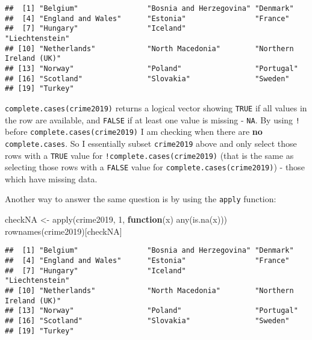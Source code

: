 \documentclass[
]{article}
\newenvironment{Shaded}{\begin{snugshade}}{\end{snugshade}}
\newcommand{\ControlFlowTok}[1]{\textcolor[rgb]{0.13,0.29,0.53}{\textbf{#1}}}
\newcommand{\DecValTok}[1]{\textcolor[rgb]{0.00,0.00,0.81}{#1}}
\newcommand{\FunctionTok}[1]{\textcolor[rgb]{0.00,0.00,0.00}{#1}}
\newcommand{\NormalTok}[1]{#1}
\newcommand{\OtherTok}[1]{\textcolor[rgb]{0.56,0.35,0.01}{#1}}
\begin{document}
\begin{verbatim}
##  [1] "Belgium"                "Bosnia and Herzegovina" "Denmark"               
##  [4] "England and Wales"      "Estonia"                "France"                
##  [7] "Hungary"                "Iceland"                "Liechtenstein"         
## [10] "Netherlands"            "North Macedonia"        "Northern Ireland (UK)" 
## [13] "Norway"                 "Poland"                 "Portugal"              
## [16] "Scotland"               "Slovakia"               "Sweden"                
## [19] "Turkey"
\end{verbatim}

\texttt{complete.cases(crime2019)} returns a logical vector showing
\texttt{TRUE} if all values in the row are available, and \texttt{FALSE}
if at least one value is missing - \texttt{NA}. By using \texttt{!}
before \texttt{complete.cases(crime2019)} I am checking when there are
\textbf{no} \texttt{complete.cases}. So I essentially subset
\texttt{crime2019} above and only select those rows with a \texttt{TRUE}
value for \texttt{!complete.cases(crime2019)} (that is the same as
selecting those rows with a \texttt{FALSE} value for
\texttt{complete.cases(crime2019)}) - those which have missing data.

Another way to answer the same question is by using the \texttt{apply}
function:

\begin{Shaded}
\begin{Highlighting}[]
\NormalTok{checkNA }\OtherTok{\textless{}{-}} \FunctionTok{apply}\NormalTok{(crime2019, }\DecValTok{1}\NormalTok{, }\ControlFlowTok{function}\NormalTok{(x) }\FunctionTok{any}\NormalTok{(}\FunctionTok{is.na}\NormalTok{(x)))}
\FunctionTok{rownames}\NormalTok{(crime2019)[checkNA]}
\end{Highlighting}
\end{Shaded}

\begin{verbatim}
##  [1] "Belgium"                "Bosnia and Herzegovina" "Denmark"               
##  [4] "England and Wales"      "Estonia"                "France"                
##  [7] "Hungary"                "Iceland"                "Liechtenstein"         
## [10] "Netherlands"            "North Macedonia"        "Northern Ireland (UK)" 
## [13] "Norway"                 "Poland"                 "Portugal"              
## [16] "Scotland"               "Slovakia"               "Sweden"                
## [19] "Turkey"
\end{verbatim}
\end{document}
